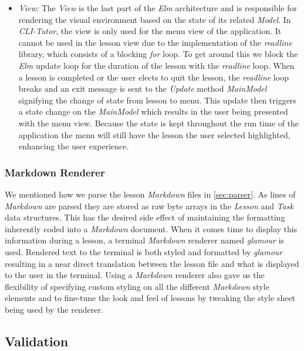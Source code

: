 \begin{itemize}
\item \textit{View:} The \textit{View} is the last part of the \textit{Elm}
    architecture and is responsible for rendering the visual environment based
    on the state of its related \textit{Model}. In \textit{CLI-Tutor}, the view
    is only used for the menu view of the application. It cannot be used in the
    lesson view due to the implementation of the \textit{readline} library,
    which consists of a blocking \textit{for} loop. To get around this we
    block the \textit{Elm} update loop for the duration of the lesson with the
    \textit{readline} loop. When a lesson is completed or the user elects to
    quit the lesson, the \textit{readline} loop breaks and an exit message is
    sent to the \textit{Update} method \textit{MainModel} signifying the change
    of state from lesson to menu. This update then triggers a state change on
    the \textit{MainModel} which results in the user being presented with the
    menu view. Because the state is kept throughout the run time of the
    application the menu will still have the lesson the user selected
    highlighted, enhancing the user experience.

\end{itemize}

\subsubsection{Markdown Renderer}

We mentioned how we parse the lesson \textit{Markdown} files in \autoref{sec:parser}. As
lines of \textit{Markdown} are parsed they are stored as raw byte arrays in the
\textit{Lesson} and \textit{Task} data structures. This has the desired side
effect of maintaining the formatting inherently coded into a \textit{Markdown}
document. When it comes time to display this information during a lesson, a
terminal \textit{Markdown} renderer named \textit{glamour} is used. Rendered
text to the terminal is both styled and formatted by \textit{glamour} resulting
in a near direct translation between the lesson file and what is displayed to
the user in the terminal. Using a \textit{Markdown} renderer also gave us the
flexibility of specifying custom styling on all the different \textit{Markdown}
style elements and to fine-tune the look and feel of lessons by tweaking the
style sheet being used by the renderer.

\subsection{Validation}

